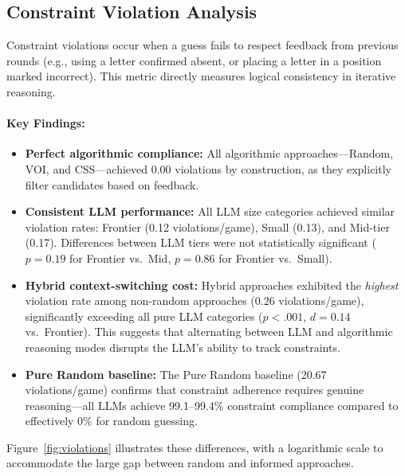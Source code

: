 \subsection{Constraint Violation Analysis}

Constraint violations occur when a guess fails to respect feedback from previous rounds (e.g., using a letter confirmed absent, or placing a letter in a position marked incorrect). This metric directly measures logical consistency in iterative reasoning.

\paragraph{Key Findings:}
\begin{itemize}
    \item \textbf{Perfect algorithmic compliance:} All algorithmic approaches---Random, VOI, and CSS---achieved 0.00 violations by construction, as they explicitly filter candidates based on feedback.
    \item \textbf{Consistent LLM performance:} All LLM size categories achieved similar violation rates: Frontier (0.12 violations/game), Small (0.13), and Mid-tier (0.17). Differences between LLM tiers were not statistically significant ($p = 0.19$ for Frontier vs.\ Mid, $p = 0.86$ for Frontier vs.\ Small).
    \item \textbf{Hybrid context-switching cost:} Hybrid approaches exhibited the \textit{highest} violation rate among non-random approaches (0.26 violations/game), significantly exceeding all pure LLM categories ($p < .001$, $d = 0.14$ vs.\ Frontier). This suggests that alternating between LLM and algorithmic reasoning modes disrupts the LLM's ability to track constraints.
    \item \textbf{Pure Random baseline:} The Pure Random baseline (20.67 violations/game) confirms that constraint adherence requires genuine reasoning---all LLMs achieve 99.1--99.4\% constraint compliance compared to effectively 0\% for random guessing.
\end{itemize}

Figure~\ref{fig:violations} illustrates these differences, with a logarithmic scale to accommodate the large gap between random and informed approaches.

